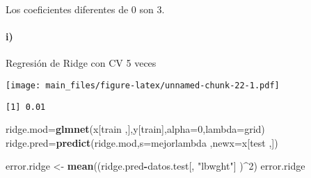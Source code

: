 \documentclass[]{article}
\newenvironment{Shaded}{\begin{snugshade}}{\end{snugshade}}
\newcommand{\KeywordTok}[1]{\textcolor[rgb]{0.13,0.29,0.53}{\textbf{#1}}}
\newcommand{\DataTypeTok}[1]{\textcolor[rgb]{0.13,0.29,0.53}{#1}}
\newcommand{\DecValTok}[1]{\textcolor[rgb]{0.00,0.00,0.81}{#1}}
\newcommand{\StringTok}[1]{\textcolor[rgb]{0.31,0.60,0.02}{#1}}
\newcommand{\OperatorTok}[1]{\textcolor[rgb]{0.81,0.36,0.00}{\textbf{#1}}}
\newcommand{\NormalTok}[1]{#1}
\let\oldparagraph\paragraph
\renewcommand{\paragraph}[1]{\oldparagraph{#1}\mbox{}}
\begin{document}
Los coeficientes diferentes de 0 son 3.

\paragraph{i)}\label{i}

Regresión de Ridge con CV 5 veces

\begin{Shaded}
\end{Shaded}

\texttt{[image: main\_files/figure-latex/unnamed-chunk-22-1.pdf]}

\begin{Shaded}
\end{Shaded}

\begin{verbatim}
[1] 0.01
\end{verbatim}

\begin{Shaded}
\begin{Highlighting}[]
\NormalTok{ridge.mod=}\KeywordTok{glmnet}\NormalTok{(x[train ,],y[train],}\DataTypeTok{alpha=}\DecValTok{0}\NormalTok{,}\DataTypeTok{lambda=}\NormalTok{grid)}
\NormalTok{ridge.pred=}\KeywordTok{predict}\NormalTok{(ridge.mod,}\DataTypeTok{s=}\NormalTok{mejorlambda ,}\DataTypeTok{newx=}\NormalTok{x[test ,])}

\NormalTok{error.ridge <-}\StringTok{ }\KeywordTok{mean}\NormalTok{((ridge.pred}\OperatorTok{-}\NormalTok{datos.test[, }\StringTok{"lbwght"}\NormalTok{] )}\OperatorTok{^}\DecValTok{2}\NormalTok{)}
\NormalTok{error.ridge}
\end{Highlighting}
\end{Shaded}
\end{document}
